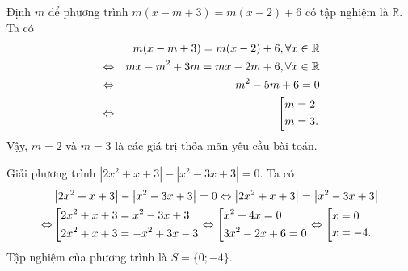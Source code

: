 \begin{bt}%
	Định $m$ để phương trình $m(x-m+3)=m(x-2)+6$ có tập nghiệm là $\mathbb{R}$.
	\loigiai 
	{
		Ta có
		\begin{eqnarray*}
			& &m(x-m+3)=m(x-2)+6, \forall x \in \mathbb{R} \\
			&\Leftrightarrow &mx-m^2+3m=mx-2m+6, \forall x \in \mathbb{R}\\
			&\Leftrightarrow &m^2-5m+6=0\\
			&\Leftrightarrow &\left[\begin{aligned}&m=2 \\ &m=3.\end{aligned}\right.
		\end{eqnarray*}
		Vậy, $m=2$ và $m=3$ là các giá trị thỏa mãn yêu cầu bài toán.
	}
\end{bt}

\begin{bt}%
	Giải phương trình $\left|2x^2+x+3\right| - \left|x^2-3x+3\right| = 0$.
	\loigiai 
	{
		Ta có
		\begin{align*}
		&\left|2x^2+x+3\right| - \left|x^2-3x+3\right| = 0 \Leftrightarrow \left|2x^2+x+3\right| = \left|x^2-3x+3\right|\\
		\Leftrightarrow &\left[\begin{aligned}&2x^2+x+3 = x^2-3x+3 \\ &2x^2+x+3 = -x^2+3x-3\end{aligned}\right. \Leftrightarrow \left[\begin{aligned}&x^2+4x=0 \\ &3x^2-2x+6=0\end{aligned}\right. \Leftrightarrow \left[\begin{aligned}&x = 0 \\& x = -4.\end{aligned}\right.
		\end{align*}
		Tập nghiệm của phương trình là $S=\{0;-4\}.$
	}
\end{bt}

